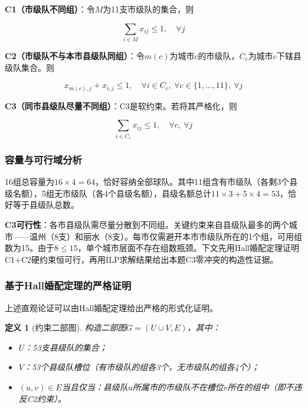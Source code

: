 \documentclass[12pt,a4paper]{article}
\newtheorem{definition}[theorem]{定义}
\begin{document}
\textbf{C1（市级队不同组）}：令$M$为11支市级队的集合，则

\begin{equation}
  \sum_{i \in M} x_{ij} \leq 1,\quad \forall j
  \label{eq:C1}
\end{equation}

\textbf{C2（市级队不与本市县级队同组）}：令$m(c)$为城市$c$的市级队，$C_c$为城市$c$下辖县级队集合。则

\begin{equation}
  x_{m(c),j} + x_{i,j} \leq 1,\quad \forall i \in C_c,\ \forall c \in \{1,\dots,11\},\ \forall j
  \label{eq:C2}
\end{equation}

\textbf{C3（同市县级队尽量不同组）}：C3是软约束。若将其严格化，则

\begin{equation}
  \sum_{i \in C_c} x_{ij} \leq 1,\quad \forall c,\ \forall j
  \label{eq:C3_hard}
\end{equation}

\subsubsection{容量与可行域分析}

16组总容量为$16 \times 4 = 64$，恰好容纳全部球队。其中11组含有市级队（各剩3个县级名额），5组无市级队（各4个县级名额），县级名额总计$11 \times 3 + 5 \times 4 = 53$，恰好等于县级队总数。

\textbf{C3可行性}：各市县级队需尽量分散到不同组。关键约束来自县级队最多的两个城市——温州（8支）和丽水（8支）。每市仅需避开本市市级队所在的1个组，可用组数为15。由于$8 \leq 15$，单个城市层面不存在组数瓶颈。下文先用Hall婚配定理证明C1+C2硬约束恒可行，再用ILP求解结果给出本题C3零冲突的构造性证据。

\subsubsection{基于Hall婚配定理的严格证明}

上述直观论证可以由Hall婚配定理给出严格的形式化证明。

\begin{definition}[约束二部图]
  构造二部图$G = (U \cup V, E)$，其中：
  \begin{itemize}
    \item $U$：53支县级队的集合；
    \item $V$：53个县级队槽位（有市级队的组各3个，无市级队的组各4个）；
    \item $(u, v) \in E$当且仅当：县级队$u$所属市的市级队不在槽位$v$所在的组中（即不违反C2约束）。
  \end{itemize}
\end{definition}
\end{document}
